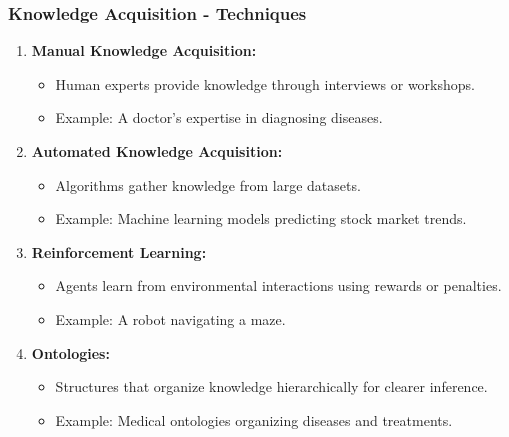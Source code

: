 \documentclass[aspectratio=169]{beamer}
\begin{document}
\begin{frame}[fragile]
    \frametitle{Knowledge Acquisition - Techniques}
    \begin{enumerate}
        \item \textbf{Manual Knowledge Acquisition:}
            \begin{itemize}
                \item Human experts provide knowledge through interviews or workshops.
                \item Example: A doctor’s expertise in diagnosing diseases.
            \end{itemize}
        \item \textbf{Automated Knowledge Acquisition:}
            \begin{itemize}
                \item Algorithms gather knowledge from large datasets.
                \item Example: Machine learning models predicting stock market trends.
            \end{itemize}
        \item \textbf{Reinforcement Learning:}
            \begin{itemize}
                \item Agents learn from environmental interactions using rewards or penalties.
                \item Example: A robot navigating a maze.
            \end{itemize}
        \item \textbf{Ontologies:}
            \begin{itemize}
                \item Structures that organize knowledge hierarchically for clearer inference.
                \item Example: Medical ontologies organizing diseases and treatments.
            \end{itemize}
    \end{enumerate}
\end{frame}
\end{document}
